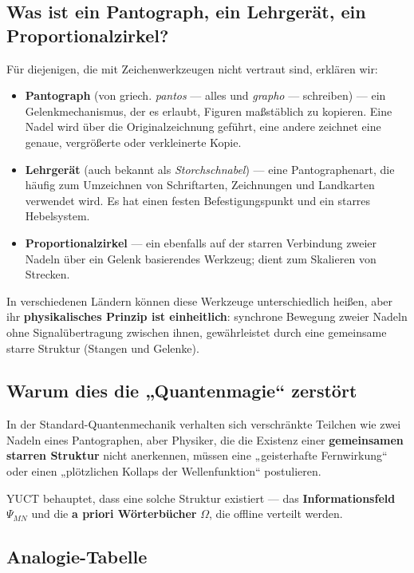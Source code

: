 \documentclass[12pt,a4paper]{article}
\begin{document}
	\subsection{Was ist ein Pantograph, ein Lehrgerät, ein Proportionalzirkel?}
	
	Für diejenigen, die mit Zeichenwerkzeugen nicht vertraut sind, erklären wir:
	
	\begin{itemize}
		\item \textbf{Pantograph} (von griech. \textit{pantos} — alles und \textit{grapho} — schreiben) — ein Gelenkmechanismus, der es erlaubt, Figuren maßstäblich zu kopieren. Eine Nadel wird über die Originalzeichnung geführt, eine andere zeichnet eine genaue, vergrößerte oder verkleinerte Kopie.
		\item \textbf{Lehrgerät} (auch bekannt als \textit{Storchschnabel}) — eine Pantographenart, die häufig zum Umzeichnen von Schriftarten, Zeichnungen und Landkarten verwendet wird. Es hat einen festen Befestigungspunkt und ein starres Hebelsystem.
		\item \textbf{Proportionalzirkel} — ein ebenfalls auf der starren Verbindung zweier Nadeln über ein Gelenk basierendes Werkzeug; dient zum Skalieren von Strecken.
	\end{itemize}
	
	In verschiedenen Ländern können diese Werkzeuge unterschiedlich heißen, aber ihr \textbf{physikalisches Prinzip ist einheitlich}: synchrone Bewegung zweier Nadeln ohne Signalübertragung zwischen ihnen, gewährleistet durch eine gemeinsame starre Struktur (Stangen und Gelenke).
	
	\subsection{Warum dies die „Quantenmagie“ zerstört}
	
	In der Standard-Quantenmechanik verhalten sich verschränkte Teilchen wie zwei Nadeln eines Pantographen, aber Physiker, die die Existenz einer \textbf{gemeinsamen starren Struktur} nicht anerkennen, müssen eine „geisterhafte Fernwirkung“ oder einen „plötzlichen Kollaps der Wellenfunktion“ postulieren.
	
	YUCT behauptet, dass eine solche Struktur existiert — das \textbf{Informationsfeld} \(\Psi_{MN}\) und die \textbf{a priori Wörterbücher} \(\Omega\), die offline verteilt werden.
	
	\subsection{Analogie-Tabelle}
	
\end{document}
